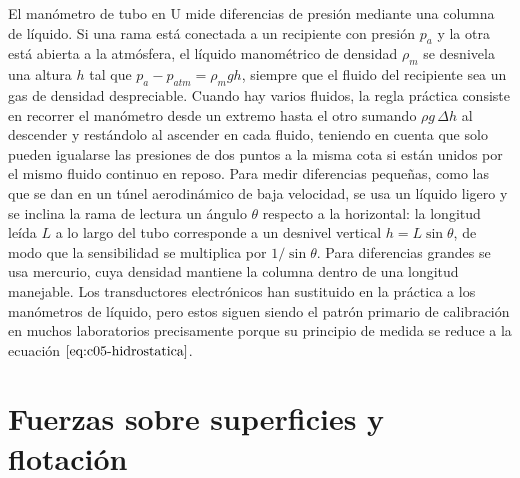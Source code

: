 \documentclass[10pt,openany]{book}
\begin{document}
El manómetro de tubo en U mide diferencias de presión mediante una columna de líquido. Si una rama está conectada a un recipiente con presión \(p_a\) y la otra está abierta a la atmósfera, el líquido manométrico de densidad \(\rho_m\) se desnivela una altura \(h\) tal que \(p_a - p_{atm} = \rho_m g h\), siempre que el fluido del recipiente sea un gas de densidad despreciable. Cuando hay varios fluidos, la regla práctica consiste en recorrer el manómetro desde un extremo hasta el otro sumando \(\rho g\,\Delta h\) al descender y restándolo al ascender en cada fluido, teniendo en cuenta que solo pueden igualarse las presiones de dos puntos a la misma cota si están unidos por el mismo fluido continuo en reposo. Para medir diferencias pequeñas, como las que se dan en un túnel aerodinámico de baja velocidad, se usa un líquido ligero y se inclina la rama de lectura un ángulo \(\theta\) respecto a la horizontal: la longitud leída \(L\) a lo largo del tubo corresponde a un desnivel vertical \(h = L\sin\theta\), de modo que la sensibilidad se multiplica por \(1/\sin\theta\). Para diferencias grandes se usa mercurio, cuya densidad mantiene la columna dentro de una longitud manejable. Los transductores electrónicos han sustituido en la práctica a los manómetros de líquido, pero estos siguen siendo el patrón primario de calibración en muchos laboratorios precisamente porque su principio de medida se reduce a la ecuación \(\eqref{eq:c05-hidrostatica}\).

\section{Fuerzas sobre superficies y flotación}
\end{document}
